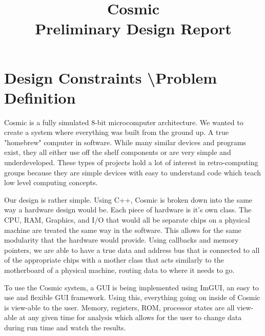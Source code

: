 \documentclass[conference]{IEEEtran}
\begin{document}
\title{
 Cosmic\\Preliminary Design Report}

\author{
\and
{}

}

\maketitle

\section{Design Constraints \textbackslash Problem Definition}

Cosmic is a fully simulated 8-bit microcomputer architecture. We wanted to create a system where everything was built from the ground up. A true "homebrew" computer  in software. While many similar devices and programs exist, they all either use off the shelf components or are very simple and underdeveloped. These types of projects hold a lot of interest in retro-computing groups because they are simple devices with easy to understand code which teach low level computing concepts.

Our design is rather simple. Using C++, Cosmic is broken down into the same way a hardware design would be. Each piece of hardware is it's own class. The CPU, RAM, Graphics, and I/O that would all be separate chips on a physical machine are treated the same way in the software. This allows for the same modularity that the hardware would provide. Using callbacks and memory pointers, we are able to have a true data and address bus that is connected to all of the appropriate chips with a mother class that acts similarly to the motherboard of a physical machine, routing data to where it needs to go. 

To use the Cosmic system, a GUI is being implemented using ImGUI, an easy to use and flexible GUI framework. Using this, everything going on inside of Cosmic is view-able to the user. Memory, registers, ROM, processor states are all view-able at any given time for analysis which allows for the user to change data during run time and watch the results.
\end{document}
